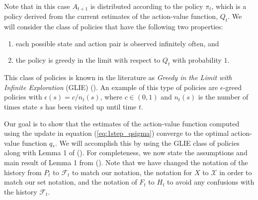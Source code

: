 Note that in this case $A_{t+1}$ is distributed according to the policy $\pi_t$, which is a policy derived from the current estimates of the action-value function, $Q_t$. 
We will consider the class of policies that have the following two properties:
\begin{enumerate}
\item each possible state and action pair is observed infinitely often, and
\item the policy is greedy in the limit with respect to $Q_t$ with probability $1$.
\end{enumerate}
%
This class of policies is known in the literature as \textit{Greedy in the Limit with Infinite Exploration} (GLIE) (\cite{Singh2000}).
An example of this type of policies are $\epsilon$-greed policies with $\epsilon(s) = c / n_t(s)$, where $c \in (0,1)$ and $n_t(s)$ is the number of times state $s$ has been visited up until time $t$. 

Our goal is to show that the estimates of the action-value function computed using the update in equation (\ref{eq:1step_qsigma}) converge to the optimal action-value function $q_*$.
We will accomplish this by using the GLIE class of policies along with Lemma 1 of \citeauthor{Singh2000} (\citeyear{Singh2000}).
For completeness, we now state the assumptions and main result of Lemma 1 from \citeauthor{Singh2000} (\citeyear{Singh2000}).
Note that we have changed the notation of the history from $P_t$ to $\mathcal{F}_t$ to match our notation, the notation for $X$ to $\mathcal{X}$ in order to match our set notation, and the notation of $F_t$ to $H_t$ to avoid any confusions with the history $\mathcal{F}_t$.

